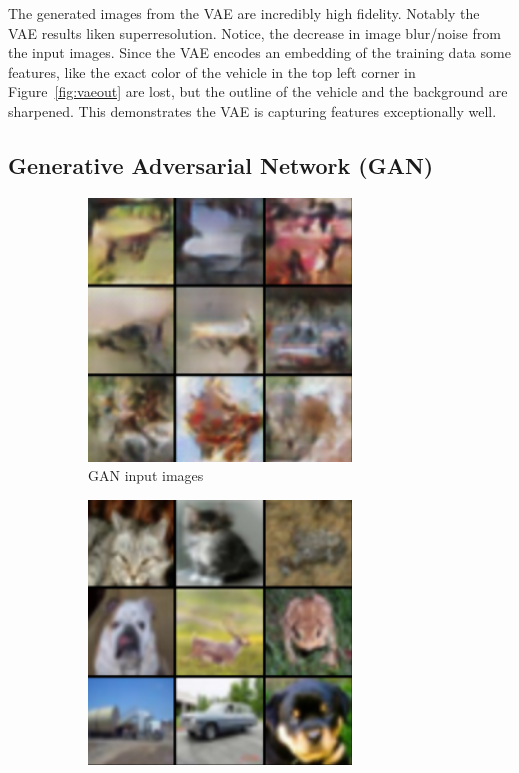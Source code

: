 \documentclass[%
 reprint,
 amsmath,amssymb,
 aps,
]{revtex4-2}
\begin{document}
The generated images from the VAE are incredibly high fidelity. Notably the VAE results liken superresolution. Notice, the decrease in image blur/noise from the input images. Since the VAE encodes an embedding of the training data some features, like the exact color of the vehicle in the top left corner in Figure~\ref{fig:vaeout} are lost, but the outline of the vehicle and the background are sharpened. This demonstrates the VAE is capturing features exceptionally well.

\subsection{Generative Adversarial Network (GAN)}

\begin{figure}[h]
    \begin{subfigure}{\columnwidth}
        \centering
        \includegraphics[width=.8\linewidth]{ganin.png}
        \caption{GAN input images}
        \label{fig:ganin}
    \end{subfigure}
    \hfill
    \begin{subfigure}{\columnwidth}
        \centering
        \includegraphics[width=.8\linewidth]{ganout.png}

\end{subfigure}
\end{figure}
\end{document}
